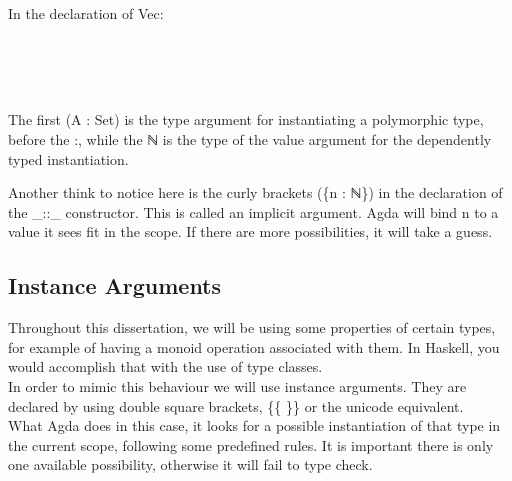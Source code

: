 \documentclass[12pt,twoside,notitlepage]{report}
\begin{document}
  In the declaration of Vec: \\

\begin{code}
\>  \AgdaSymbol{(} \AgdaSymbol{:} \AgdaSymbol{)} \AgdaSymbol{:}    \<%
\\
\>[0]\<[2]%
\>[2]\AgdaInductiveConstructor{[]} \<[6]%
\>[6]\AgdaSymbol{:}   \<%
\\
\>[0]\<[2]%
\>[2] \AgdaSymbol{:}  \AgdaSymbol{\{}\AgdaSymbol{\}}          \AgdaSymbol{(} \AgdaSymbol{)} \<[45]%
\>[45]\<%
\end{code}\\

  The first (A : Set) is the type argument for instantiating a polymorphic type, before the :, while the ℕ is the type of the value argument for
  the dependently typed instantiation.

  Another think to notice here is the curly brackets (\{n : ℕ\}) in the declaration of the \_::\_ constructor.
  This is called an implicit argument. Agda will bind n to a value it sees fit in the scope. If there are more possibilities, it will take a guess.

\subsection{Instance Arguments}

  Throughout this dissertation, we will be using some properties of certain types, for example of having a monoid operation associated with them.
  In Haskell, you would accomplish that with the use of type classes.\\
  In order to mimic this behaviour we will use instance arguments. They are declared by using double square brackets, \{\{ \}\} or the unicode
  equivalent. \\
  What Agda does in this case, it looks for a possible instantiation of that type in the current scope, following some predefined rules.
  It is important there is only one available possibility, otherwise it will fail to type check.
\end{document}
